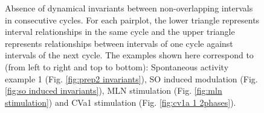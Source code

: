 \begin{figure}[htbp]
	\caption{Absence of dynamical invariants between non-overlapping intervals in consecutive cycles. For each pairplot, the lower triangle represents interval relationships in the same cycle and the upper triangle represents relationships between intervals of one cycle against  intervals of the next cycle. The examples shown here correspond to (from left to right and top to bottom): Spontaneous activity example 1 (Fig. \ref{fig:prep2 invariants}), SO induced modulation (Fig. \ref{fig:so induced invariants}), MLN stimulation (Fig. \ref{fig:mln stimulation}) and CVa1 stimulation (Fig. \ref{fig:cv1a 1 2phases}).}
	\label{fig:reset pairplot comparison}
\end{figure}

\clearpage
\newpage
